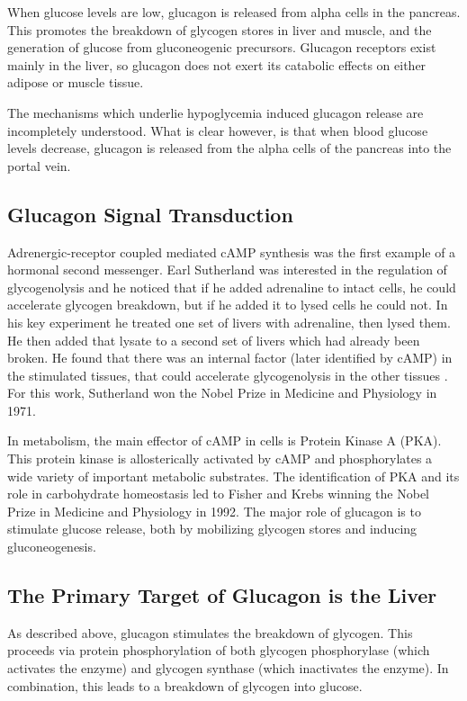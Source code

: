 \documentclass{tufte-handout}
\begin{document}
 When glucose levels are low, glucagon is released from alpha cells in the pancreas.  This promotes the breakdown of glycogen stores in liver and muscle, and the generation of glucose from gluconeogenic precursors.  Glucagon receptors exist mainly in the liver, so glucagon does not exert its catabolic effects on either adipose or muscle tissue. 

The mechanisms which underlie hypoglycemia induced glucagon release are incompletely understood.  What is clear however, is that when blood glucose levels decrease, glucagon is released from the alpha cells of the pancreas into the portal vein.

\subsection{Glucagon Signal Transduction}

Adrenergic-receptor coupled mediated cAMP synthesis was the first example of a hormonal second messenger.  Earl Sutherland was interested in the regulation of glycogenolysis and he noticed that if he added adrenaline to intact cells, he could accelerate glycogen breakdown, but if he added it to lysed cells he could not.  In his key experiment he treated one set of livers with adrenaline, then lysed them.  He then added that lysate to a second set of livers which had already been broken.  He found that there was an internal factor (later identified by cAMP) in the stimulated tissues, that could accelerate glycogenolysis in the other tissues \cite{Rall1956}.  For this work, Sutherland won the Nobel Prize in Medicine and Physiology in 1971.

In metabolism, the main effector of cAMP in cells is Protein Kinase A (PKA).  This protein kinase is allosterically activated by cAMP and phosphorylates a wide variety of important metabolic substrates.  The identification of PKA and its role in carbohydrate homeostasis led to Fisher and Krebs winning the Nobel Prize in Medicine and Physiology in 1992.  The major role of glucagon is to stimulate glucose release, both by mobilizing glycogen stores and inducing gluconeogenesis.

\subsection{The Primary Target of Glucagon is the Liver}

As described above, glucagon stimulates the breakdown of glycogen.  This proceeds via protein phosphorylation of both glycogen phosphorylase (which activates the enzyme) and glycogen synthase (which inactivates the enzyme).  In combination, this leads to a breakdown of glycogen into glucose.
\end{document}
